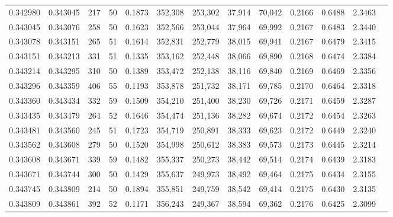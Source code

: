 \begin{tabular}{rrrrrrrrrrrrr}
0.342980 & 0.343045 &   217 &  50 &                                     0.1873 & 352,308 & 253,302 &  37,914 &  70,042 & 0.2166 & 0.6488 & 2.3463 \\
0.343045 & 0.343076 &   258 &  50 &                                     0.1623 & 352,566 & 253,044 &  37,964 &  69,992 & 0.2167 & 0.6483 & 2.3440 \\
0.343078 & 0.343151 &   265 &  51 &                                     0.1614 & 352,831 & 252,779 &  38,015 &  69,941 & 0.2167 & 0.6479 & 2.3415 \\
0.343151 & 0.343213 &   331 &  51 &                                     0.1335 & 353,162 & 252,448 &  38,066 &  69,890 & 0.2168 & 0.6474 & 2.3384 \\
0.343214 & 0.343295 &   310 &  50 &                                     0.1389 & 353,472 & 252,138 &  38,116 &  69,840 & 0.2169 & 0.6469 & 2.3356 \\
0.343296 & 0.343359 &   406 &  55 &                                     0.1193 & 353,878 & 251,732 &  38,171 &  69,785 & 0.2170 & 0.6464 & 2.3318 \\
0.343360 & 0.343434 &   332 &  59 &                                     0.1509 & 354,210 & 251,400 &  38,230 &  69,726 & 0.2171 & 0.6459 & 2.3287 \\
0.343435 & 0.343479 &   264 &  52 &                                     0.1646 & 354,474 & 251,136 &  38,282 &  69,674 & 0.2172 & 0.6454 & 2.3263 \\
0.343481 & 0.343560 &   245 &  51 &                                     0.1723 & 354,719 & 250,891 &  38,333 &  69,623 & 0.2172 & 0.6449 & 2.3240 \\
0.343562 & 0.343608 &   279 &  50 &                                     0.1520 & 354,998 & 250,612 &  38,383 &  69,573 & 0.2173 & 0.6445 & 2.3214 \\
0.343608 & 0.343671 &   339 &  59 &                                     0.1482 & 355,337 & 250,273 &  38,442 &  69,514 & 0.2174 & 0.6439 & 2.3183 \\
0.343671 & 0.343744 &   300 &  50 &                                     0.1429 & 355,637 & 249,973 &  38,492 &  69,464 & 0.2175 & 0.6434 & 2.3155 \\
0.343745 & 0.343809 &   214 &  50 &                                     0.1894 & 355,851 & 249,759 &  38,542 &  69,414 & 0.2175 & 0.6430 & 2.3135 \\
0.343809 & 0.343861 &   392 &  52 &                                     0.1171 & 356,243 & 249,367 &  38,594 &  69,362 & 0.2176 & 0.6425 & 2.3099 \\

\end{tabular}
